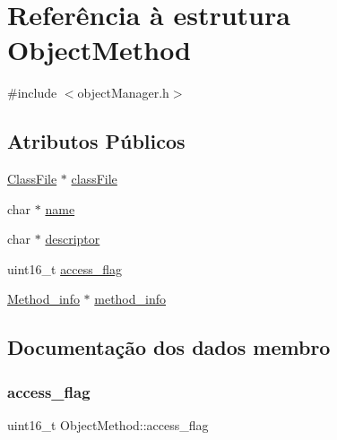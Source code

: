\hypertarget{struct_object_method}{}\section{Referência à estrutura Object\+Method}
\label{struct_object_method}


{\ttfamily \#include $<$object\+Manager.\+h$>$}

\subsection*{Atributos Públicos}
\begin{DoxyCompactItemize}
\item 
\hyperlink{struct_class_file}{Class\+File} $\ast$ \hyperlink{struct_object_method_afd44c68b384d0f2d6d5d7a56f5231921}{class\+File}
\item 
char $\ast$ \hyperlink{struct_object_method_a4e8b8c4a58edfdc9331eec931905e8c1}{name}
\item 
char $\ast$ \hyperlink{struct_object_method_ae7d442f2fdbcdf5968d32df65c61d0e2}{descriptor}
\item 
uint16\+\_\+t \hyperlink{struct_object_method_ac0cd7b4090ae18594c83addedeff69fa}{access\+\_\+flag}
\item 
\hyperlink{struct_method__info}{Method\+\_\+info} $\ast$ \hyperlink{struct_object_method_a63acf8290f2ab0e103f87171a4866ca2}{method\+\_\+info}
\end{DoxyCompactItemize}


\subsection{Documentação dos dados membro}
\hypertarget{struct_object_method_ac0cd7b4090ae18594c83addedeff69fa}{}\label{struct_object_method_ac0cd7b4090ae18594c83addedeff69fa} 
\subsubsection{\texorpdfstring{access\+\_\+flag}{access\_flag}}
{\footnotesize\ttfamily uint16\+\_\+t Object\+Method\+::access\+\_\+flag}

\hypertarget{struct_object_method_afd44c68b384d0f2d6d5d7a56f5231921}{}\label{struct_object_method_afd44c68b384d0f2d6d5d7a56f5231921} 
